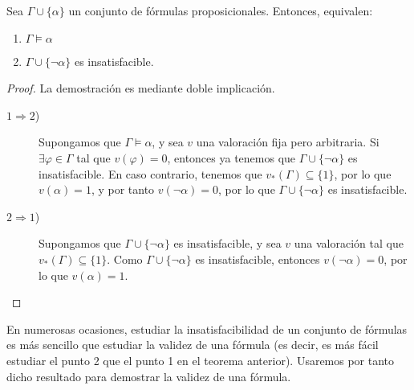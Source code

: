 \begin{teo}
    Sea $\Gamma\cup \{\alpha\}$ un conjunto de fórmulas proposicionales. Entonces, equivalen:
    \begin{enumerate}
        \item $\Gamma\models \alpha$
        \item $\Gamma\cup \{\lnot \alpha\}$ es insatisfacible.
    \end{enumerate}

    \begin{proof}
        La demostración es mediante doble implicación.
        \begin{description}
            \item[$1\Longrightarrow 2$)] Supongamos que $\Gamma\models \alpha$, y sea $v$ una valoración fija pero arbitraria.
            Si $\exists \varphi\in \Gamma$ tal que $v(\varphi)=0$, entonces ya tenemos que $\Gamma \cup \{\lnot \alpha\}$ es insatisfacible.
            En caso contrario, tenemos que $v_\ast(\Gamma)\subseteq \{1\}$, por lo que $v(\alpha)=1$, y por tanto $v(\lnot \alpha)=0$, por lo que $\Gamma\cup \{\lnot \alpha\}$ es insatisfacible.

            \item[$2\Longrightarrow 1$)] Supongamos que $\Gamma\cup \{\lnot \alpha\}$ es insatisfacible,
            y sea $v$ una valoración tal que $v_\ast(\Gamma)\subseteq \{1\}$.
            Como $\Gamma\cup \{\lnot \alpha\}$ es insatisfacible, entonces $v(\lnot \alpha)=0$, por lo que $v(\alpha)=1$.
        \end{description}
    \end{proof}
\end{teo}
\begin{observacion}
    En numerosas ocasiones, estudiar la insatisfacibilidad de un conjunto de fórmulas es más sencillo que estudiar la validez de una fórmula
    (es decir, es más fácil estudiar el punto 2 que el punto 1 en el teorema anterior). Usaremos por tanto dicho resultado para demostrar la validez de una fórmula.
\end{observacion}


